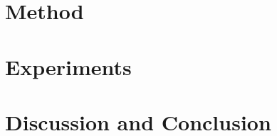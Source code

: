 \documentclass{article}
\theoremstyle{definition}
\theoremstyle{remark}
\begin{document}
\section{Method}


\section{Experiments}


\section{Discussion and Conclusion}






\newpage
\appendix



\clearpage

\end{document}
